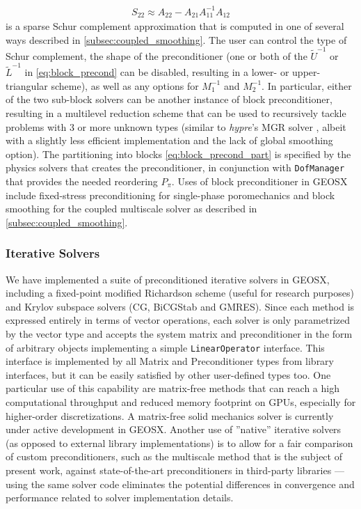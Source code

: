 \begin{align}
    S_{22} \approx A_{22} - A_{21} A_{11}^{-1} A_{12}
\end{align}
is a sparse Schur complement approximation that is computed in one of several ways described in \cref{subsec:coupled_smoothing}.   The user can control the type of Schur complement, the shape of the preconditioner (one or both of the $\widetilde{U}^{-1}$ or $\widetilde{L}^{-1}$ in \cref{eq:block_precond} can be disabled, resulting in a lower- or upper-triangular scheme), as well as any options for $M_1^{-1}$ and $M_2^{-1}$.   In particular, either of the two sub-block solvers can be another instance of block preconditioner, resulting in a multilevel reduction scheme that can be used to recursively tackle problems with 3 or more unknown types (similar to \textit{hypre}'s MGR solver \cite{Bui2020}, albeit with a slightly less efficient implementation and the lack of global smoothing option).   The partitioning into blocks \cref{eq:block_precond_part} is specified by the physics solvers that creates the preconditioner, in conjunction with \texttt{DofManager} that provides the needed reordering $P_\pi$.   Uses of block preconditioner in GEOSX include fixed-stress preconditioning for single-phase poromechanics \cite{White2015} and block smoothing for the coupled multiscale solver as described in \cref{subsec:coupled_smoothing}.

\subsubsection{Iterative Solvers}

We have implemented a suite of preconditioned iterative solvers in GEOSX, including a fixed-point modified Richardson scheme (useful for research purposes) and Krylov subspace solvers (CG, BiCGStab and GMRES).   Since each method is expressed entirely in terms of vector operations, each solver is only parametrized by the vector type and accepts the system matrix and preconditioner in the form of arbitrary objects implementing a simple \texttt{LinearOperator} interface.   This interface is implemented by all Matrix and Preconditioner types from library interfaces, but it can be easily satisfied by other user-defined types too.   One particular use of this capability are matrix-free methods that can reach a high computational throughput and reduced memory footprint on GPUs, especially for higher-order discretizations.   A matrix-free solid mechanics solver is currently under active development in GEOSX.   Another use of ''native'' iterative solvers (as opposed to external library implementations) is to allow for a fair comparison of custom preconditioners, such as the multiscale method that is the subject of present work, against state-of-the-art preconditioners in third-party libraries --- using the same solver code eliminates the potential differences in convergence and performance related to solver implementation details.

